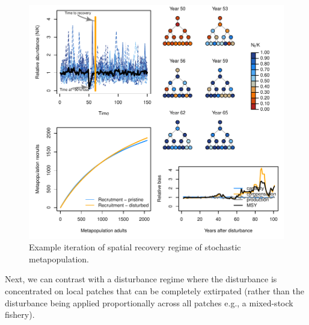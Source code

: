 \documentclass[
]{article}
\begin{document}
\begin{figure}[H]

{\centering \includegraphics{Managing_for_ecological_surprises_in_metapopulations_files/figure-latex/example results3-1} 

}

\caption{Example iteration of spatial recovery regime of stochastic metapopulation.}\label{fig:example results3}
\end{figure}
\newpage

Next, we can contrast with a disturbance regime where the disturbance is
concentrated on local patches that can be completely extirpated (rather
than the disturbance being applied proportionally across all patches
e.g., a mixed-stock fishery).
\end{document}
